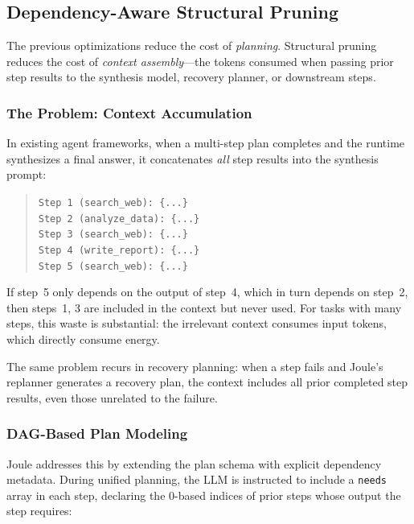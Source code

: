 \subsection{Dependency-Aware Structural Pruning}
\label{sec:pruning}

The previous optimizations reduce the cost of \emph{planning}. Structural pruning reduces the cost of \emph{context assembly}---the tokens consumed when passing prior step results to the synthesis model, recovery planner, or downstream steps.

\subsubsection{The Problem: Context Accumulation}

In existing agent frameworks, when a multi-step plan completes and the runtime synthesizes a final answer, it concatenates \emph{all} step results into the synthesis prompt:

\begin{quote}
\small
\texttt{Step 1 (search\_web): \{...\}} \\
\texttt{Step 2 (analyze\_data): \{...\}} \\
\texttt{Step 3 (search\_web): \{...\}} \\
\texttt{Step 4 (write\_report): \{...\}} \\
\texttt{Step 5 (search\_web): \{...\}}
\end{quote}

\noindent If step~5 only depends on the output of step~4, which in turn depends on step~2, then steps~1, 3 are included in the context but never used. For tasks with many steps, this waste is substantial: the irrelevant context consumes input tokens, which directly consume energy.

The same problem recurs in recovery planning: when a step fails and Joule's replanner generates a recovery plan, the context includes all prior completed step results, even those unrelated to the failure.

\subsubsection{DAG-Based Plan Modeling}

Joule addresses this by extending the plan schema with explicit dependency metadata. During unified planning, the LLM is instructed to include a \texttt{needs} array in each step, declaring the 0-based indices of prior steps whose output the step requires:

